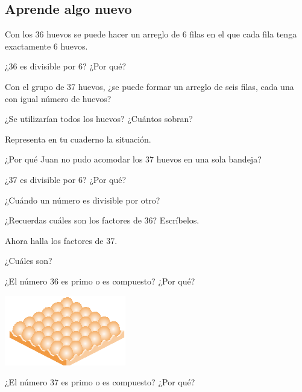 \documentclass[10pt,twoside]{article}
\begin{document}
\subsection*{Aprende algo nuevo}
Con los 36 huevos se puede hacer un arreglo de 6 filas en el que cada fila tenga exactamente 6 huevos.
\begin{itemize}
\item  ¿36 es divisible por 6? ¿Por qué?

\begin{minipage}{.55\textwidth}
 \item  Con el grupo de 37 huevos, ¿se puede formar un arreglo
de seis filas, cada una con igual número de huevos?
 \item ¿Se utilizarían todos los huevos? ¿Cuántos sobran?
 \item Representa en tu cuaderno la situación.
 \item  ¿Por qué Juan no pudo acomodar los 37 huevos en una sola bandeja?
\item ¿37 es divisible por 6? ¿Por qué?
\item ¿Cuándo un número es divisible por otro?
\item ¿Recuerdas cuáles son los factores de 36? Escríbelos.
\item Ahora halla los factores de 37.
\item ¿Cuáles son?
\item ¿El número 36 es primo o es compuesto? ¿Por qué?
\end{minipage}\hfill
\begin{minipage}{.35\textwidth}
 \begin{center}
 \includegraphics{./Images/huevos_01.png}
\end{center}
\end{minipage}
\item ¿El número 37 es primo o es compuesto? ¿Por qué?
\end{itemize}
\end{document}
